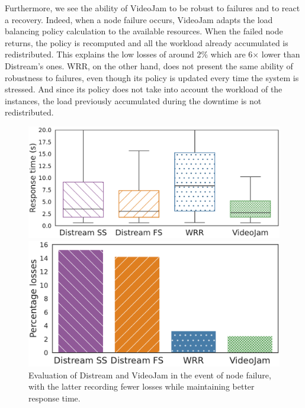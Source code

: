 Furthermore, we see the ability of VideoJam to be robust to failures and to react a recovery. Indeed, when a node failure occurs, VideoJam adapts the load balancing policy calculation to the available resources. When the failed node returns, the policy is recomputed and all the workload already accumulated is redistributed. This explains the low losses of around 2\% which are 6$\times$ lower than Distream's ones. WRR, on the other hand, does not present the same ability of robustness to failures, even though its policy is updated every time the system is stressed. And since its policy does not take into account the workload of the instances, the load previously accumulated during the downtime is not redistributed.

\begin{figure}
	\begin{minipage}[t]{.52\linewidth}
		\centering
		\includegraphics[width=\linewidth]{chapters/videojam/images/distream_vs_videojam/onfailure/response_time.pdf}
	\end{minipage}
	\hfill
	\begin{minipage}[t]{.46\linewidth}
		\centering
		\includegraphics[width=\linewidth]{chapters/videojam/images/distream_vs_videojam/onfailure/percentage_losses.pdf}
	\end{minipage}
	\vspace{-1mm}
	\caption{Evaluation of Distream and VideoJam in the event of node failure, with the latter recording fewer losses while maintaining better response time.}
	\vspace{-3mm}
	\label{fig:distream_vs_videojam_onfailure}
\end{figure}



